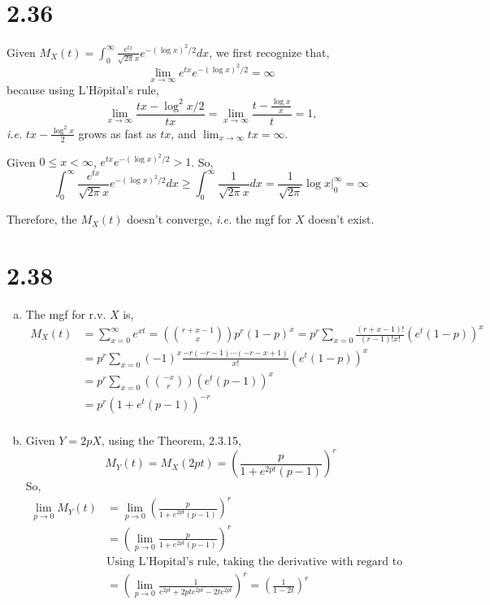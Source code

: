 \documentclass[letter]{article}
\begin{document}
    \section*{2.36}
    Given 
    $M_X(t) = \int_0^\infty \frac{e^{tx}}{\sqrt{2\pi}x} e^{-(\log x)^2/2} dx$, we first recognize that, 
    \[
    \lim_{x \to \infty} e^{tx}e^{-(\log x)^2/2} = \infty
    \]
    because using L'H$\hat o$pital's rule,
    \[
    \lim_{x \to \infty} \frac{tx - \log^2x/2}{tx} = \lim_{x \to \infty} \frac{t-\frac{\log x}{x}}{t} = 1,
    \]
    \emph{i.e.} $tx - \frac{\log^2 x}{2}$ grows as fast as $tx$, and $\lim_{x \to \infty} tx = \infty$. 

    Given $0 \le x < \infty$, $e^{tx}e^{-(\log x)^2/2} > 1$. So,
    \[
    \int_0^\infty \frac{e^{tx}}{\sqrt{2\pi}x} e^{-(\log x)^2/2} dx \ge
    \int_0^\infty \frac{1}{\sqrt{2\pi}x} dx = \frac{1}{\sqrt{2 \pi}} \log x|^\infty_0 = \infty
    \]
    
    Therefore, the $M_X(t)$ doesn't converge, \emph{i.e.} the mgf for $X$ doesn't exist.
    \section*{2.38}
    \begin{enumerate}[(a)]
    \item
    The mgf for r.v. $X$ is, 
    \begin{align*}
    M_X(t) &= \sum_{x=0}^\infty e^{xt} = \left(r+x-1 \choose x\right) p^r (1-p)^x 
    = p^r \sum_{x=0} \frac{(r+x-1)!}{(r-1)!x!} \left(e^t(1-p)\right)^x \\
    & = p^r \sum_{x=0} (-1)^x \frac{-r(-r-1)\cdots(-r-x+1)}{x!} \left(e^t(1-p)\right)^x \\
    & = p^r \sum_{x=0} \left(-x \choose r\right) \left(e^t(p-1)\right)^x \\
    & = p^r\left(1+e^t(p-1)\right)^{-r} \\
    \end{align*}
    \item Given $Y=2pX$, using the Theorem, 2.3.15,
    \[
    M_Y(t) = M_X(2pt) = \left(\frac{p}{1+e^{2pt}(p-1)}\right)^r
    \]
    So,
    \begin{align*}
    \lim_{p \to 0} M_Y(t) & = \lim_{p \to 0} \left(\frac{p}{1+e^{2pt}(p-1)}\right)^r \\
    & = \left(\lim_{p \to 0} \frac{p}{1+e^{2pt}(p-1)}\right)^r \\
    & \text{Using L'Hopital's rule, taking the derivative with regard to p on both numerator and denominator,}\\
    & = \left(\lim_{p \to 0} \frac{1}{e^{2pt} + 2pte^{2pt} - 2t e^{2pt}}\right)^r = \left(\frac{1}{1-2t} \right)^r
    \end{align*}
    \end{enumerate}
\end{document}
